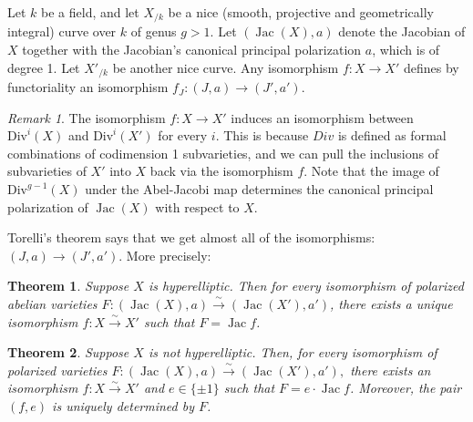 \documentclass[12pt,reqno]{amsart}
\DeclareMathOperator{\Jac}{Jac}
\newtheorem*{thm*}{Theorem}
\theoremstyle{definition}
\theoremstyle{remark}
\newtheorem*{remark}{Remark}
\begin{document}
Let $k$ be a field, and let $X_{/k}$ be a nice (smooth, projective and geometrically integral) curve over $k$ of genus $g > 1$.  Let $(\operatorname{Jac}(X),a)$ denote the Jacobian of $X$ together with the Jacobian's canonical principal polarization $a$, which is of degree 1.  Let $X'_{/k}$ be another nice curve. Any isomorphism $f: X \to X'$ defines by functoriality an isomorphism $f_J: (J, a) \to (J', a')$. 

\begin{remark} The isomorphism $f: X \to X'$ induces an isomorphism between $\text{Div}^i(X)$ and $\text{Div}^i(X')$ for every $i$. This is because $Div$ is defined as formal combinations of codimension 1 subvarieties, and we can pull the inclusions of subvarieties of $X'$ into $X$ back via the isomorphism $f$. Note that the image of $\text{Div}^{g-1}(X)$ under the Abel-Jacobi map determines the canonical principal polarization of $\Jac(X)$ with respect to $X$. \end{remark}

 


Torelli's theorem says that we get almost all of the isomorphisms: $(J, a) \to (J', a')$. More precisely:

\begin{thm*} Suppose $X$ is hyperelliptic.  Then for every isomorphism of polarized abelian varieties $F: (\operatorname{Jac}(X),a) \stackrel{\sim}{\rightarrow} (\operatorname{Jac}(X'),a')$, there exists a unique isomorphism $f: X \stackrel{\sim}{\rightarrow} X'$ such that $F = \operatorname{Jac} f$.  \end{thm*}

\begin{thm*} Suppose $X$ is not hyperelliptic.  Then, for every isomorphism of polarized varieties $F: (\operatorname{Jac}(X),a) \stackrel{\sim}{\rightarrow} (\operatorname{Jac}(X'),a'),$ there exists an isomorphism $f: X \stackrel{\sim}{\rightarrow} X'$ and $e \in \{ \pm 1\}$ such that $F = e \cdot  \operatorname{Jac} f$.  Moreover, the pair $(f,e)$ is uniquely determined by $F$. \end{thm*}
\end{document}
